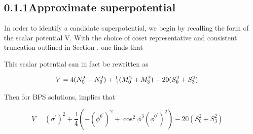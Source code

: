 \documentclass{article}
\begin{document}
\subsection*{0.1.1Approximate superpotential}


In order to identify a candidate superpotential, we begin by recalling the form of the scalar
potential V. With the choice of coset representative and consistent truncation outlined in
Section , one finds that


This scalar potential can in fact be rewritten as


\begin{equation}
\begin{array} { c c } { V = 4 ( N _ { 0 } ^ { 2 } + N _ { 3 } ^ { 2 } ) + \frac { 1 } { 4 } ( M _ { 0 } ^ { 2 } + M _ { 3 } ^ { 2 } ) - 2 0 ( S _ { 0 } ^ { 2 } + S _ { 3 } ^ { 2 } ) ~ }\end{array}
\end{equation}


Then for BPS solutions, implies that


\begin{equation}
V = ( \sigma ^ { \prime } ) ^ { 2 } + \frac { 1 } { 4 } \left ( - ( \phi ^ { 0 ^ { \prime } } ) ^ { 2 } + \cos ^ { 2 } \phi ^ { 3 } ( \phi ^ { 0 ^ { \prime } } ) ^ { 2 } \right ) - 2 0 ( S _ { 0 } ^ { 2 } + S _ { 3 } ^ { 2 } ) ~
\end{equation}
\end{document}
